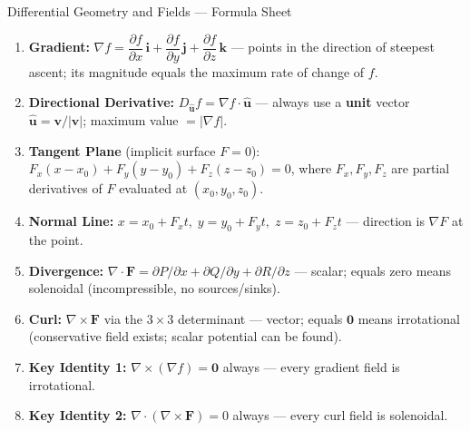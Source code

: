 \documentclass[12pt,a4paper]{article}
\begin{document}
\begin{learnbox}{Differential Geometry and Fields --- Formula Sheet}
\begin{enumerate}[leftmargin=*, label=\textbf{\arabic*.}]
  \item \textbf{Gradient:} $\nabla f = \dfrac{\partial f}{\partial x}\,\mathbf{i} + \dfrac{\partial f}{\partial y}\,\mathbf{j} + \dfrac{\partial f}{\partial z}\,\mathbf{k}$ --- points in the direction of steepest ascent; its magnitude equals the maximum rate of change of $f$.

  \item \textbf{Directional Derivative:} $D_{\hat{\mathbf{u}}} f = \nabla f \cdot \hat{\mathbf{u}}$ --- always use a \textbf{unit} vector $\hat{\mathbf{u}} = \mathbf{v}/|\mathbf{v}|$; maximum value $= |\nabla f|$.

  \item \textbf{Tangent Plane} (implicit surface $F = 0$): $F_x(x-x_0) + F_y(y-y_0) + F_z(z-z_0) = 0$, where $F_x, F_y, F_z$ are partial derivatives of $F$ evaluated at $(x_0, y_0, z_0)$.

  \item \textbf{Normal Line:} $x = x_0 + F_x t,\; y = y_0 + F_y t,\; z = z_0 + F_z t$ --- direction is $\nabla F$ at the point.

  \item \textbf{Divergence:} $\nabla \cdot \mathbf{F} = \partial P/\partial x + \partial Q/\partial y + \partial R/\partial z$ --- scalar; equals zero means solenoidal (incompressible, no sources/sinks).

  \item \textbf{Curl:} $\nabla \times \mathbf{F}$ via the $3 \times 3$ determinant --- vector; equals $\mathbf{0}$ means irrotational (conservative field exists; scalar potential can be found).

  \item \textbf{Key Identity 1:} $\nabla \times (\nabla f) = \mathbf{0}$ always --- every gradient field is irrotational.

  \item \textbf{Key Identity 2:} $\nabla \cdot (\nabla \times \mathbf{F}) = 0$ always --- every curl field is solenoidal.
\end{enumerate}
\end{learnbox}
\end{document}
